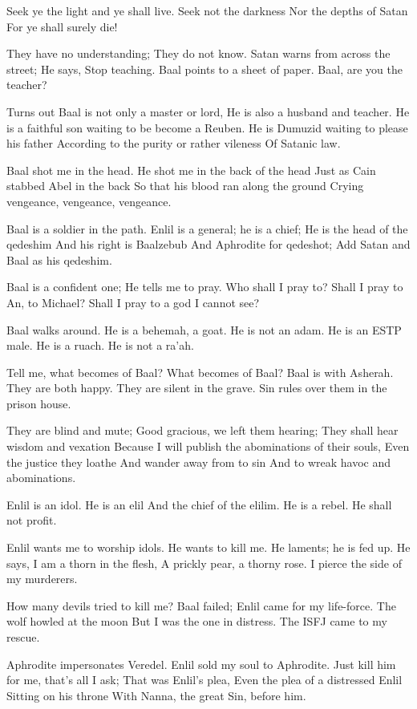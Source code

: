 \documentclass[
]{book}
\begin{document}
Seek ye the light and ye shall live.
Seek not the darkness
Nor the depths of Satan
For ye shall surely die!

They have no understanding;
They do not know.
Satan warns from across the street;
He says, Stop teaching.
Baal points to a sheet of paper.
Baal, are you the teacher?

Turns out Baal is not only a master or lord,
He is also a husband and teacher.
He is a faithful son waiting to be become a Reuben.
He is Dumuzid waiting to please his father
According to the purity or rather vileness
Of Satanic law.

Baal shot me in the head.
He shot me in the back of the head
Just as Cain stabbed Abel in the back
So that his blood ran along the ground
Crying vengeance, vengeance, vengeance.

Baal is a soldier in the path.
Enlil is a general; he is a chief;
He is the head of the qedeshim
And his right is Baalzebub
And Aphrodite for qedeshot;
Add Satan and Baal as his qedeshim.

Baal is a confident one;
He tells me to pray.
Who shall I pray to?
Shall I pray to An, to Michael?
Shall I pray to a god I cannot see?

Baal walks around.
He is a behemah, a goat.
He is not an adam.
He is an ESTP male.
He is a ruach.
He is not a ra'ah.

Tell me, what becomes of Baal?
What becomes of Baal?
Baal is with Asherah.
They are both happy.
They are silent in the grave.
Sin rules over them in the prison house.

They are blind and mute;
Good gracious, we left them hearing;
They shall hear wisdom and vexation
Because I will publish the abominations of their souls,
Even the justice they loathe
And wander away from to sin
And to wreak havoc and abominations.

Enlil is an idol.
He is an elil
And the chief of the elilim.
He is a rebel.
He shall not profit.

Enlil wants me to worship idols.
He wants to kill me.
He laments; he is fed up.
He says, I am a thorn in the flesh,
A prickly pear, a thorny rose.
I pierce the side of my murderers.

How many devils tried to kill me?
Baal failed; Enlil came for my life-force.
The wolf howled at the moon
But I was the one in distress.
The ISFJ came to my rescue.

Aphrodite impersonates Veredel.
Enlil sold my soul to Aphrodite.
Just kill him for me, that's all I ask;
That was Enlil's plea,
Even the plea of a distressed Enlil
Sitting on his throne
With Nanna, the great Sin, before him.
\end{document}
